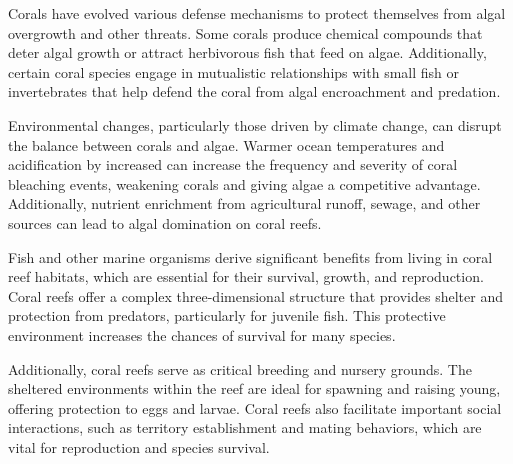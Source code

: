 Corals have evolved various defense mechanisms to protect themselves from algal overgrowth and other threats. Some corals produce chemical compounds that deter algal growth or attract herbivorous fish that feed on algae. Additionally, certain coral species engage in mutualistic relationships with small fish or invertebrates that help defend the coral from algal encroachment and predation.

Environmental changes, particularly those driven by climate change, can disrupt the balance between corals and algae. Warmer ocean temperatures and acidification by increased  can increase the frequency and severity of coral bleaching events, weakening corals and giving algae a competitive advantage. Additionally, nutrient enrichment from agricultural runoff, sewage, and other sources can lead to algal domination on coral reefs. 

Fish and other marine organisms derive significant benefits from living in coral reef habitats, which are essential for their survival, growth, and reproduction. Coral reefs offer a complex three-dimensional structure that provides shelter and protection from predators, particularly for juvenile fish. This protective environment increases the chances of survival for many species.


Additionally, coral reefs serve as critical breeding and nursery grounds. The sheltered environments within the reef are ideal for spawning and raising young, offering protection to eggs and larvae. Coral reefs also facilitate important social interactions, such as territory establishment and mating behaviors, which are vital for reproduction and species survival.

